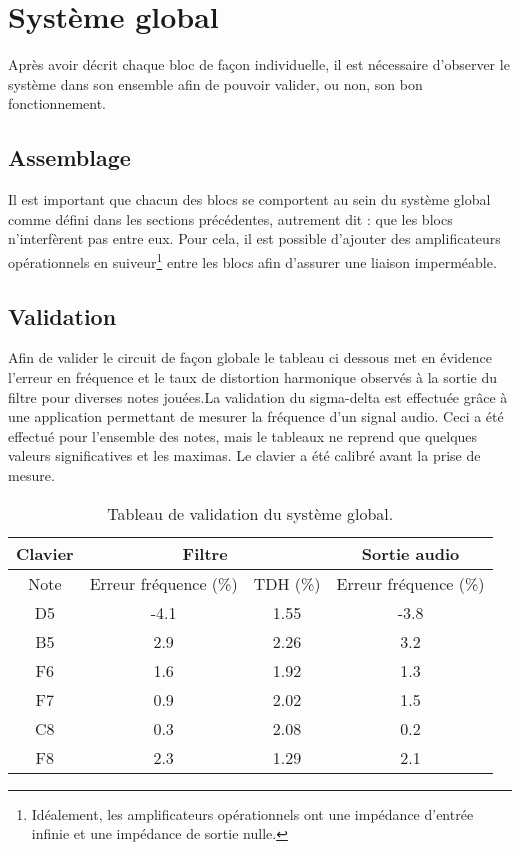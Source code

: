 \chapter{Système global}
Après avoir décrit chaque bloc de façon individuelle, il est nécessaire d'observer le système dans son ensemble afin de pouvoir valider, ou non, son bon fonctionnement. 

\section{Assemblage}
Il est important que chacun des blocs se comportent au sein
du système global comme défini dans les sections précédentes, 
autrement dit : que les blocs n'interfèrent pas entre eux.
Pour cela, il est possible d'ajouter des amplificateurs 
opérationnels en suiveur\footnote{Idéalement, les amplificateurs opérationnels
ont une impédance d'entrée infinie et une impédance de sortie nulle.} 
entre les blocs afin d'assurer une liaison imperméable. 

\section{Validation}
Afin de valider le circuit de façon globale le tableau ci
dessous met en évidence l'erreur en fréquence et le taux de
distortion harmonique observés à la sortie du filtre pour
diverses notes jouées.La validation du sigma-delta est
effectuée grâce à une application  permettant de
mesurer la fréquence d'un signal audio. Ceci a été effectué
pour l'ensemble des notes, mais le tableaux ne reprend que
quelques valeurs significatives et les maximas. Le clavier a
été calibré avant la prise de mesure.

\begin{table}
	\centering
	\begin{tabular}{|c|c|c|c|}
		\hline
		Clavier &  \multicolumn{2}{c|}{Filtre} &  Sortie audio \\
		 \hline
		Note &  Erreur fréquence (\%) & TDH (\%) &  Erreur fréquence (\%) \\
		\hline
		D5 &  -4.1 & 1.55 & -3.8\\
		B5 &  2.9 & 2.26 & 3.2\\
		F6 &  1.6 & 1.92 & 1.3\\
		F7 &  0.9 & 2.02 & 1.5\\
		C8 &  0.3 & 2.08 & 0.2\\
		F8 &  2.3 & 1.29 & 2.1\\
		\hline
	\end{tabular}
	\caption{Tableau de validation du système global.}
	\label{tab:tab-global}
\end{table}

